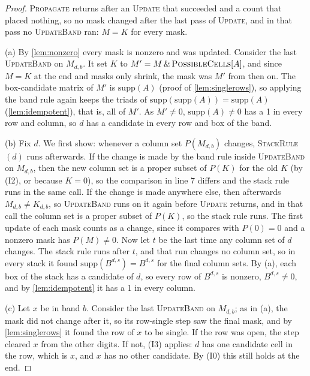 \begin{proof}
\textsc{Propagate} returns after an \textsc{Update} that succeeded and a count that placed nothing, so no mask changed
after the last pass of \textsc{Update}, and in that pass no \textsc{UpdateBand} ran: $M=K$ for every mask.

(a) By \cref{lem:nonzero} every mask is nonzero and was updated. Consider the last \textsc{UpdateBand} on
$M_{d,b}$. It set $K$ to $M' = M\,\&\,\textsc{PossibleCells}[A]$, and since $M=K$ at the end and masks only shrink, the
mask was $M'$ from then on. The box-candidate matrix of $M'$ is $\mathrm{supp}(A)$ (proof of \cref{lem:singlerows}), so
applying the band rule again keeps the triads of $\mathrm{supp}(\mathrm{supp}(A))=\mathrm{supp}(A)$
(\cref{lem:idempotent}), that is, all of $M'$. As $M'\neq 0$, $\mathrm{supp}(A)\neq 0$ has a 1 in every row and column,
so $d$ has a candidate in every row and box of the band.

(b) Fix $d$. We first show: whenever a column set $P(M_{d,b})$ changes, \textsc{StackRule}$(d)$ runs afterwards. If the
change is made by the band rule inside \textsc{UpdateBand} on $M_{d,b}$, then the new column set is a proper subset of
$P(K)$ for the old $K$ (by (I2), or because $K=0$), so the comparison in line 7 differs and the stack rule runs in the
same call. If the change is made anywhere else, then afterwards $M_{d,b}\neq K_{d,b}$, so \textsc{UpdateBand} runs on
it again before \textsc{Update} returns, and in that call the column set is a proper subset of $P(K)$, so the stack
rule runs. The first update of each mask counts as a change, since it compares with $P(0)=0$ and a nonzero mask has
$P(M)\neq 0$. Now let $t$ be the last
time any column set of $d$ changes. The stack rule runs after $t$, and that run changes no column set, so in every
stack it found $\mathrm{supp}(B^{d,s})=B^{d,s}$ for the final column sets. By (a), each box of the stack has a candidate
of $d$, so every row of $B^{d,s}$ is nonzero, $B^{d,s}\neq 0$, and by \cref{lem:idempotent} it has a 1 in every
column.

(c) Let $x$ be in band $b$. Consider the last \textsc{UpdateBand} on $M_{d,b}$; as in (a), the mask did not change after
it, so its row-single step saw the final mask, and by \cref{lem:singlerows} it found the row of $x$ to be single. If the
row was open, the step cleared $x$ from the other digits. If not, (I3) applies: $d$ has one candidate cell in the row,
which is $x$, and $x$ has no other candidate. By (I0) this still holds at the end.
\end{proof}

